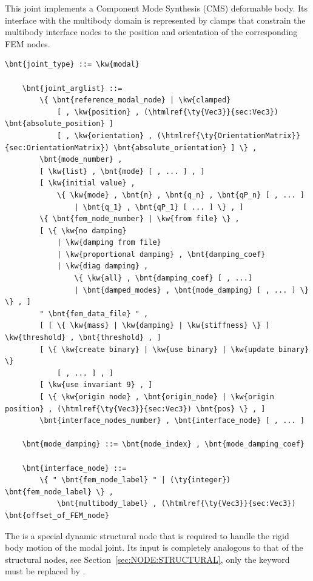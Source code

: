 This joint implements a Component Mode Synthesis (CMS) deformable body.
Its interface with the multibody domain is represented by clamps
that constrain the multibody interface nodes to the position
and orientation of the corresponding FEM nodes.
\begin{Verbatim}[commandchars=\\\{\}]
    \bnt{joint_type} ::= \kw{modal}

    \bnt{joint_arglist} ::=
        \{ \bnt{reference_modal_node} | \kw{clamped}
            [ , \kw{position} , (\htmlref{\ty{Vec3}}{sec:Vec3}) \bnt{absolute_position} ]
            [ , \kw{orientation} , (\htmlref{\ty{OrientationMatrix}}{sec:OrientationMatrix}) \bnt{absolute_orientation} ] \} ,
        \bnt{mode_number} ,
        [ \kw{list} , \bnt{mode} [ , ... ] , ]
        [ \kw{initial value} ,
            \{ \kw{mode} , \bnt{n} , \bnt{q_n} , \bnt{qP_n} [ , ... ]
                | \bnt{q_1} , \bnt{qP_1} [ ... ] \} , ]
        \{ \bnt{fem_node_number} | \kw{from file} \} ,
        [ \{ \kw{no damping}
            | \kw{damping from file}
            | \kw{proportional damping} , \bnt{damping_coef}
            | \kw{diag damping} ,
                \{ \kw{all} , \bnt{damping_coef} [ , ...]
                | \bnt{damped_modes} , \bnt{mode_damping} [ , ... ] \} \} , ]
        " \bnt{fem_data_file} " ,
        [ [ \{ \kw{mass} | \kw{damping} | \kw{stiffness} \} ] \kw{threshold} , \bnt{threshold} , ]
        [ \{ \kw{create binary} | \kw{use binary} | \kw{update binary} \}
            [ , ... ] , ]
        [ \kw{use invariant 9} , ]
        [ \{ \kw{origin node} , \bnt{origin_node} | \kw{origin position} , (\htmlref{\ty{Vec3}}{sec:Vec3}) \bnt{pos} \} , ]
        \bnt{interface_nodes_number} , \bnt{interface_node} [ , ... ]

    \bnt{mode_damping} ::= \bnt{mode_index} , \bnt{mode_damping_coef}

    \bnt{interface_node} ::=
        \{ " \bnt{fem_node_label} " | (\ty{integer}) \bnt{fem_node_label} \} ,
            \bnt{multibody_label} , (\htmlref{\ty{Vec3}}{sec:Vec3}) \bnt{offset_of_FEM_node}
\end{Verbatim}
The  is a special dynamic structural node 
that is required to handle the rigid body motion of the modal joint.
Its input is completely analogous to that of the  structural
nodes, see Section~\ref{sec:NODE:STRUCTURAL}, only the keyword  
must be replaced by .

